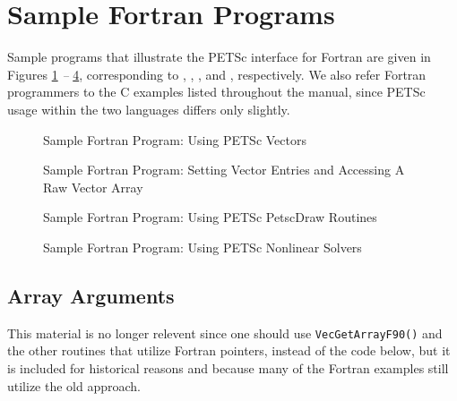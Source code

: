 \section{Sample Fortran Programs}
\label{sec_fortran-examples}

Sample programs that illustrate the PETSc interface for Fortran
are given in Figures \ref{fig_vec-Fortran} {\em --} \ref{fig_SNES-Fortran},
corresponding to
\href{https://www.mcs.anl.gov/petsc/petsc-current/src/vec/vec/tests/ex19f.F.html}{},
\href{https://www.mcs.anl.gov/petsc/petsc-current/src/vec/vec/tutorials/ex4f.F.html}{},
\break
\href{https://www.mcs.anl.gov/petsc/petsc-current/src/sys/classes/draw/tests/ex5f.F.html}{}, and
\href{https://www.mcs.anl.gov/petsc/petsc-current/src/snes/tutorials/ex1f.F90.html}{}, respectively.  We also
refer Fortran programmers to the C examples listed throughout the manual,
since PETSc usage within the two languages differs only slightly.

\begin{figure}[H]
  
\caption{Sample Fortran Program:  Using PETSc Vectors}
\label{fig_vec-Fortran}
\end{figure}

\begin{figure}[H]
  
\caption{Sample Fortran Program: Setting Vector Entries and Accessing A Raw Vector Array}
\label{fig_vec2-Fortran}
\end{figure}

\begin{figure}[H]
  
\caption{Sample Fortran Program:  Using PETSc PetscDraw Routines}
\label{fig_draw-Fortran}
\end{figure}

\begin{figure}[H]
  
\caption{Sample Fortran Program:  Using PETSc Nonlinear Solvers}
\label{fig_SNES-Fortran}
\end{figure}

\subsection{Array Arguments}
\label{sec_fortranarrays}

This material is no longer relevent since one should use \lstinline{VecGetArrayF90()} and the other routines that utilize Fortran pointers, instead of the code below, but it is included for historical reasons and because many of the Fortran examples still utilize the old approach.

